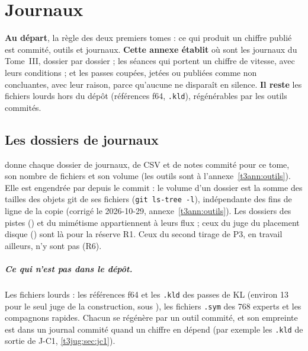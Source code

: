 
\chapter{Journaux}\label{t3ann:journaux}

\begin{origine}
\textbf{Au départ}, la règle des deux premiers tomes : ce qui produit un chiffre publié est commité, outils et journaux.
\textbf{Cette annexe établit} où sont les journaux du Tome~III, dossier par dossier ; les séances qui portent un chiffre de vitesse, avec leurs conditions ; et les passes coupées, jetées ou publiées comme non concluantes, avec leur raison, parce qu'aucune ne disparaît en silence.
\textbf{Il reste} les fichiers lourds hors du dépôt (références f64, \texttt{.kld}), régénérables par les outils commités.
\end{origine}

\section{Les dossiers de journaux}\label{t3ann:sec:dossiers}

 donne chaque dossier de journaux, de CSV et de notes commité pour ce tome, son nombre de fichiers et son volume (les outils sont à l'annexe~\ref{t3ann:outils}). Elle est engendrée par  depuis le commit : le volume d'un dossier est la somme des tailles des objets git de ses fichiers (\texttt{git ls-tree -l}), indépendante des fins de ligne de la copie (corrigé le 2026-10-29, annexe~\ref{t3ann:outils}). Les dossiers des pistes () et du mimétisme appartiennent à leurs flux ; ceux du juge du placement disque () sont là pour la réserve R1. Ceux du second tirage de P3, en travail ailleurs, n'y sont pas (R6).



\paragraph{Ce qui n'est pas dans le dépôt.} Les fichiers lourds : les références f64 et les \texttt{.kld} des passes de KL (environ \SI{13}{\Go} pour le seul juge de la construction, sous ), les fichiers \texttt{.sym} des 768 experts et les compagnons rapides. Chacun se régénère par un outil commité, et son empreinte est dans un journal commité quand un chiffre en dépend (par exemple les \texttt{.kld} de sortie de J-C1, \cref{t3jug:sec:jc1}).

